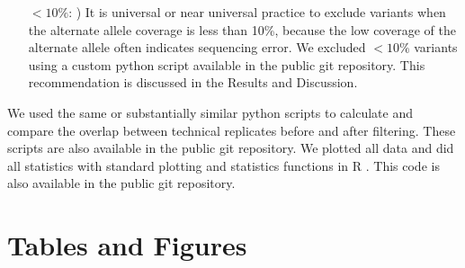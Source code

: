 \documentclass[11pt]{article} %
\begin{document}
\begin{itemize}
\item[$<10\%$:]) It is universal or near universal practice to exclude variants when the alternate allele coverage is less than 10\%, because the low coverage of the alternate allele often indicates sequencing error. We excluded $<10\%$ variants using a custom python script available in the public git repository. This recommendation is discussed in the Results and Discussion.
\end{itemize}

We used the same or substantially similar python scripts to calculate and compare the overlap between technical replicates before and after filtering. These scripts are also available in the public git repository. We plotted all data and did all statistics with standard plotting and statistics functions in R \citep{Rsoftware}. This code is also available in the public git repository.  





\section*{Tables and Figures}
\end{document}
